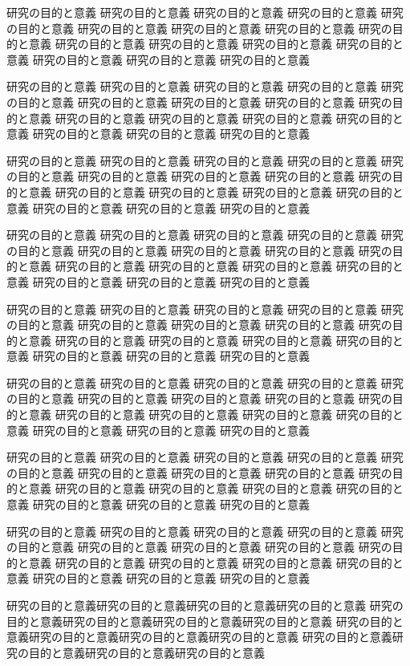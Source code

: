 \documentclass[12pt]{jarticle} %
\begin{document}
研究の目的と意義 研究の目的と意義 研究の目的と意義 研究の目的と意義 
研究の目的と意義 研究の目的と意義 研究の目的と意義 研究の目的と意義 
研究の目的と意義 研究の目的と意義 研究の目的と意義 研究の目的と意義 
研究の目的と意義 研究の目的と意義 研究の目的と意義 研究の目的と意義 

研究の目的と意義 研究の目的と意義 研究の目的と意義 研究の目的と意義 
研究の目的と意義 研究の目的と意義 研究の目的と意義 研究の目的と意義 
研究の目的と意義 研究の目的と意義 研究の目的と意義 研究の目的と意義 
研究の目的と意義 研究の目的と意義 研究の目的と意義 研究の目的と意義 

研究の目的と意義 研究の目的と意義 研究の目的と意義 研究の目的と意義 
研究の目的と意義 研究の目的と意義 研究の目的と意義 研究の目的と意義 
研究の目的と意義 研究の目的と意義 研究の目的と意義 研究の目的と意義 
研究の目的と意義 研究の目的と意義 研究の目的と意義 研究の目的と意義 

研究の目的と意義 研究の目的と意義 研究の目的と意義 研究の目的と意義 
研究の目的と意義 研究の目的と意義 研究の目的と意義 研究の目的と意義 
研究の目的と意義 研究の目的と意義 研究の目的と意義 研究の目的と意義 
研究の目的と意義 研究の目的と意義 研究の目的と意義 研究の目的と意義 

研究の目的と意義 研究の目的と意義 研究の目的と意義 研究の目的と意義 
研究の目的と意義 研究の目的と意義 研究の目的と意義 研究の目的と意義 
研究の目的と意義 研究の目的と意義 研究の目的と意義 研究の目的と意義 
研究の目的と意義 研究の目的と意義 研究の目的と意義 研究の目的と意義 

研究の目的と意義 研究の目的と意義 研究の目的と意義 研究の目的と意義 
研究の目的と意義 研究の目的と意義 研究の目的と意義 研究の目的と意義 
研究の目的と意義 研究の目的と意義 研究の目的と意義 研究の目的と意義 
研究の目的と意義 研究の目的と意義 研究の目的と意義 研究の目的と意義 

研究の目的と意義 研究の目的と意義 研究の目的と意義 研究の目的と意義 
研究の目的と意義 研究の目的と意義 研究の目的と意義 研究の目的と意義 
研究の目的と意義 研究の目的と意義 研究の目的と意義 研究の目的と意義 
研究の目的と意義 研究の目的と意義 研究の目的と意義 研究の目的と意義 

研究の目的と意義 研究の目的と意義 研究の目的と意義 研究の目的と意義 
研究の目的と意義 研究の目的と意義 研究の目的と意義 研究の目的と意義 
研究の目的と意義 研究の目的と意義 研究の目的と意義 研究の目的と意義 
研究の目的と意義 研究の目的と意義 研究の目的と意義 研究の目的と意義 

研究の目的と意義研究の目的と意義研究の目的と意義研究の目的と意義 
研究の目的と意義研究の目的と意義研究の目的と意義研究の目的と意義 
研究の目的と意義研究の目的と意義研究の目的と意義研究の目的と意義 
研究の目的と意義研究の目的と意義研究の目的と意義研究の目的と意義 
\end{document}
